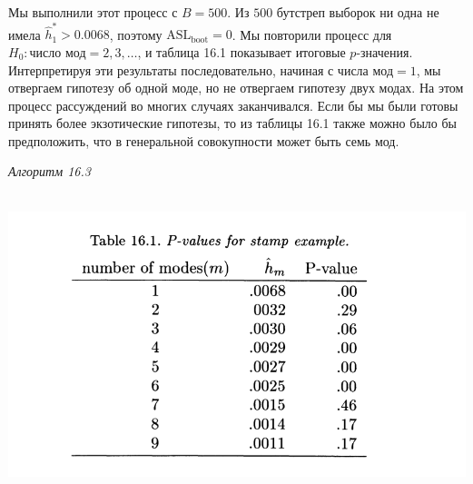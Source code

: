 Мы выполнили этот процесс с $B = 500$. Из $500$ бутстреп выборок ни одна не имела $\hat{h}^{*}_1 > 0.0068$, поэтому $\text{ASL}_{\text{boot}} = 0$. Мы повторили процесс для $H_0: \text{число мод} = 2, 3, \ldots$, и таблица 16.1 показывает итоговые $p$-значения. Интерпретируя эти результаты последовательно, начиная с $\text{числа мод} = 1$, мы отвергаем гипотезу об одной моде, но не отвергаем гипотезу двух модах. На этом процесс рассуждений во многих случаях заканчивался. Если бы мы были готовы принять более экзотические гипотезы, то из таблицы 16.1 также можно было бы предположить, что в генеральной совокупности может быть семь мод.

\begin{center}
    \textit{Алгоритм 16.3}
\end{center}
\\

\noindent
\includegraphics[width=\linewidth]{16/t16.1.png}









